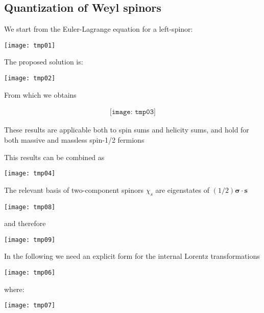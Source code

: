 \subsection{Quantization of Weyl spinors}
\begin{frame}

We start from the Euler-Lagrange equation for a left-spinor:

\texttt{[image: tmp01]} 

The proposed solution is:

\texttt{[image: tmp02]} 

From which we obtains 

\begin{align}
  \texttt{[image: tmp03]} 
\end{align}

These results are applicable both to spin sums and helicity sums, and hold for both massive and massless spin-1/2 fermions

\end{frame}

This results can be combined as 

\texttt{[image: tmp04]}

The relevant basis of two-component spinors $\chi_s$ are eigenstates of $(1/2)\boldsymbol{\sigma}\cdot \boldsymbol{s}$

\texttt{[image: tmp08]}  

and therefore

\texttt{[image: tmp09]}  



In the following we need an explicit form for the internal Lorentz transformations

\texttt{[image: tmp06]} 

where:

\texttt{[image: tmp07]} 

